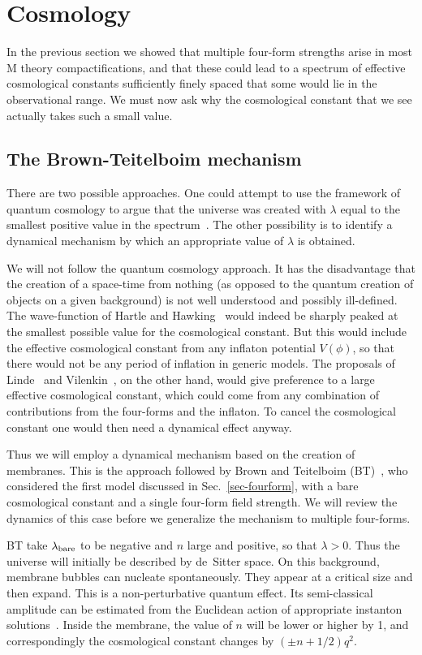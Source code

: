 \documentclass[12pt]{article}
\newcommand{\sect}[1]{\setcounter{equation}{0}\section{#1}}
\begin{document}
\sect{Cosmology}
\label{sec-cosmology}

In the previous section we showed that multiple four-form strengths
arise in most M theory compactifications, and that these could lead to
a spectrum of effective cosmological constants sufficiently finely
spaced that some would lie in the observational range.  We must now
ask why the cosmological constant that we see actually takes such a
small value.


\subsection{The Brown-Teitelboim mechanism}
\label{sec-bt}

There are two possible approaches.  One could attempt to use the
framework of quantum cosmology to argue that the universe was created
with $\lambda$ equal to the smallest positive value in the
spectrum~\cite{Haw84b,Duf89,DunJen90}.  The other possibility is to
identify a dynamical mechanism by which an appropriate value of
$\lambda$ is obtained.

We will not follow the quantum cosmology approach.  It has the
disadvantage that the creation of a space-time from nothing (as
opposed to the quantum creation of objects on a given background) is
not well understood and possibly ill-defined.  The wave-function of
Hartle and Hawking~\cite{HarHaw83} would indeed be sharply peaked at
the smallest possible value for the cosmological constant.  But this
would include the effective cosmological constant from any inflaton
potential $V(\phi)$, so that there would not be any period of
inflation in generic models.  The proposals of Linde~\cite{Lin84b} and
Vilenkin~\cite{Vil86}, on the other hand, would give preference to a
large effective cosmological constant, which could come from any
combination of contributions from the four-forms and the inflaton.  To
cancel the cosmological constant one would then need a dynamical
effect anyway.

Thus we will employ a dynamical mechanism based on the creation of
membranes.  This is the approach followed by Brown and Teitelboim
(BT)~\cite{BroTei87,BroTei88}, who considered the first model
discussed in Sec.~\ref{sec-fourform}, with a bare cosmological
constant and a single four-form field strength.  We will review the
dynamics of this case before we generalize the mechanism to multiple
four-forms.

BT take $\lambda_{\rm bare}$ to be negative and $n$ large and
positive, so that $\lambda>0$.  Thus the universe will initially be
described by de~Sitter space.  On this background, membrane bubbles
can nucleate spontaneously.  They appear at a critical size and then
expand.  This is a non-perturbative quantum effect.  Its
semi-classical amplitude can be estimated from the Euclidean action of
appropriate instanton solutions~\cite{BroTei87,BroTei88}.  Inside the
membrane, the value of $n$ will be lower or higher by 1, and
correspondingly the cosmological constant changes by $(\pm n + 1/2)
q^2$.
\end{document}
